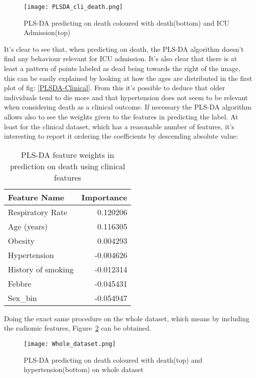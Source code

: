 \begin{figure}[htbp]
  		\texttt{[image: PLSDA\_cli\_death.png]}
          \caption{PLS-DA predicting on death coloured with death(bottom) and ICU Admission(top)\label{PLSDA-Clinical-death}}
\end{figure}

It's clear to see that, when predicting on death, the PLS-DA algorithm doesn't find any behaviour relevant for ICU admission.
It's also clear that there is at least a pattern of points labeled as dead being towards the right of the image, this can be easily explained by looking at how the ages are distributed in the first plot of fig: \ref{PLSDA-Clinical}. 
From this it's possible to deduce that older individuals tend to die more and that hypertension does not seem to be relevant when considering death as a clinical outcome.
If necessary the PLS-DA algorithm allows also to see the weights given to the features in predicting the label. At least for the clinical dataset, which has a reasonable number of features, it's interesting to report it ordering the coefficients by descending absolute value: 

\begin{table}
\caption{PLS-DA feature weights in prediction on death using clinical features}
\centering
	\begin{tabular}{|l|r|}
	\hline
	Feature Name &         Importance \\
	\hline
	 Respiratory Rate &  0.120206 \\
	 Age (years) &  0.116305 \\
	 Obesity &  0.004293 \\
	 Hypertension & -0.004626 \\
	 History of smoking & -0.012314 \\
	 Febbre & -0.045431 \\
	 Sex\_bin & -0.054947 \\
	\hline
	\end{tabular}
\end{table}

Doing the exact same procedure on the whole dataset, which means by including the radiomic features, Figure~\ref{fig:whole_dataset} can be obtained.

\begin{figure}[htbp]
  		\texttt{[image: Whole\_dataset.png]}
          \caption{PLS-DA predicting on death coloured with death(top) and hypertension(bottom) on whole dataset\label{fig:whole_dataset}}
\end{figure}



